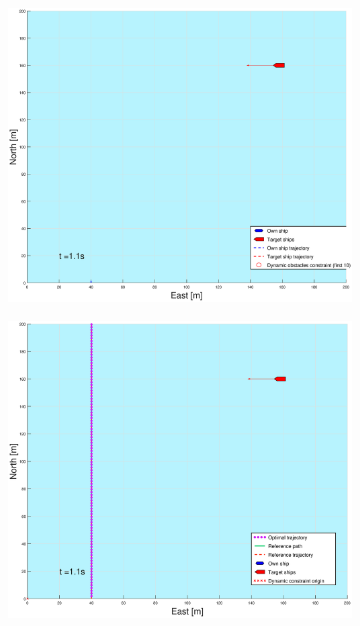 \begin{figure}[!b] %
    \begin{subfigure}[b]{0.49\textwidth}
        \centering
        \includegraphics[width=\textwidth]{Images/Figures/sving_HO/_Simple_1fig1_time=1}
    \end{subfigure}
    \hfill
    \begin{subfigure}[b]{0.499\textwidth}
        \centering
        \includegraphics[width=\textwidth]{Images/Figures/sving_HO/_Simple_1fig999_time=1}

\end{subfigure}
\end{figure}
